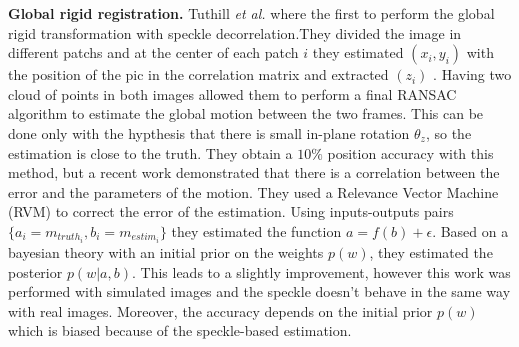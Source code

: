 \documentclass[runningheads,a4paper]{llncs}
\begin{document}
\par
\textbf{Global rigid registration.} Tuthill \textit{et al.} \cite{tuthill1998automated} where the first to perform the global rigid transformation with speckle decorrelation.They divided the image in different patchs and at the center of each patch $i$ they estimated $(x_i, y_i)$ with the position of the pic in the correlation matrix and extracted $(z_i)$ \cite{chen1997determination}.
Having two cloud of points in both images allowed them to perform a final RANSAC algorithm to estimate the global motion between the two frames. This can be done only with the hypthesis that there is small in-plane rotation $\theta_z$, so the estimation is close to the truth. 
They obtain a $10\%$ position accuracy with this method, but a recent work \cite{conrath2012towards} demonstrated that there is a correlation between the error and the parameters of the motion. 
They used a Relevance Vector Machine (RVM) to correct the error of the estimation. Using inputs-outputs pairs $\{a_i=m_{truth_i}, b_i=m_{estim_i}\}$ they estimated the function $a = f(b)+\epsilon$. Based on a bayesian theory with an initial prior on the weights $p(w)$, they estimated the posterior $p(w|a, b)$.
This leads to a slightly improvement, however this work was performed with simulated images and the speckle doesn't behave in the same way with real images. Moreover, the accuracy depends on the initial prior $p(w)$ which is biased because of the speckle-based estimation.
\end{document}
